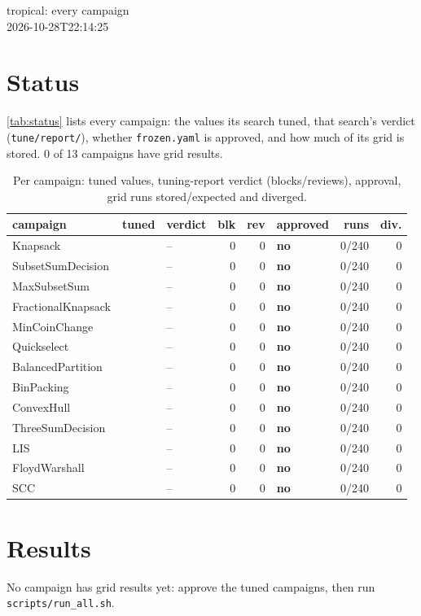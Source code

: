\documentclass[10pt]{article}
\begin{document}
\begin{center}
{\Large tropical: every campaign}\\[0.4ex]
{\small 2026-10-28T22:14:25}
\end{center}

\section{Status}
\autoref{tab:status} lists every campaign: the values its search tuned, that search's verdict (\texttt{tune/report/}), whether \texttt{frozen.yaml} is approved, and how much of its grid is stored.
0 of 13 campaigns have grid results.

{\small
\begin{longtable}{lllrrlrr}
\caption{Per campaign: tuned values, tuning-report verdict (blocks/reviews), approval, grid runs stored/expected and diverged.}\label{tab:status}\\
\toprule
campaign & tuned & verdict & blk & rev & approved & runs & div.\\
\midrule
\endhead
Knapsack &  & -- & 0 & 0 & \textbf{no} & 0/240 & 0\\
SubsetSumDecision &  & -- & 0 & 0 & \textbf{no} & 0/240 & 0\\
MaxSubsetSum &  & -- & 0 & 0 & \textbf{no} & 0/240 & 0\\
FractionalKnapsack &  & -- & 0 & 0 & \textbf{no} & 0/240 & 0\\
MinCoinChange &  & -- & 0 & 0 & \textbf{no} & 0/240 & 0\\
Quickselect &  & -- & 0 & 0 & \textbf{no} & 0/240 & 0\\
BalancedPartition &  & -- & 0 & 0 & \textbf{no} & 0/240 & 0\\
BinPacking &  & -- & 0 & 0 & \textbf{no} & 0/240 & 0\\
ConvexHull &  & -- & 0 & 0 & \textbf{no} & 0/240 & 0\\
ThreeSumDecision &  & -- & 0 & 0 & \textbf{no} & 0/240 & 0\\
LIS &  & -- & 0 & 0 & \textbf{no} & 0/240 & 0\\
FloydWarshall &  & -- & 0 & 0 & \textbf{no} & 0/240 & 0\\
SCC &  & -- & 0 & 0 & \textbf{no} & 0/240 & 0\\
\bottomrule
\end{longtable}
}

\section{Results}
No campaign has grid results yet: approve the tuned campaigns, then run \texttt{scripts/run\_all.sh}.
\end{document}
